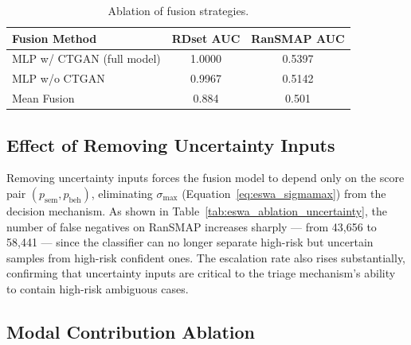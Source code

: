 \begin{table}[ht]
\centering
\caption{Ablation of fusion strategies.}
\label{tab:eswa_ablation_fusion}
\begin{tabular}{lcc}
\toprule
\textbf{Fusion Method} & \textbf{RDset AUC} & \textbf{RanSMAP AUC} \\
\midrule
MLP w/ CTGAN (full model) & 1.0000 & 0.5397 \\
MLP w/o CTGAN             & 0.9967 & 0.5142 \\
Mean Fusion               & 0.884  & 0.501  \\
\bottomrule
\end{tabular}
\end{table}

\subsection{Effect of Removing Uncertainty Inputs}

Removing uncertainty inputs forces the fusion model to depend only on the score pair $(p_\text{sem}, p_\text{beh})$, eliminating $\sigma_\text{max}$ (Equation~\eqref{eq:eswa_sigmamax}) from the decision mechanism. As shown in Table~\ref{tab:eswa_ablation_uncertainty}, the number of false negatives on RanSMAP increases sharply — from 43,656 to 58,441 — since the classifier can no longer separate high-risk but uncertain samples from high-risk confident ones. The escalation rate also rises substantially, confirming that uncertainty inputs are critical to the triage mechanism's ability to contain high-risk ambiguous cases.

\begin{table}[ht]
\centering
\caption{Effect of removing uncertainty terms on triage performance.}
\label{tab:eswa_ablation_uncertainty}
\end{table}

\subsection{Modal Contribution Ablation}

